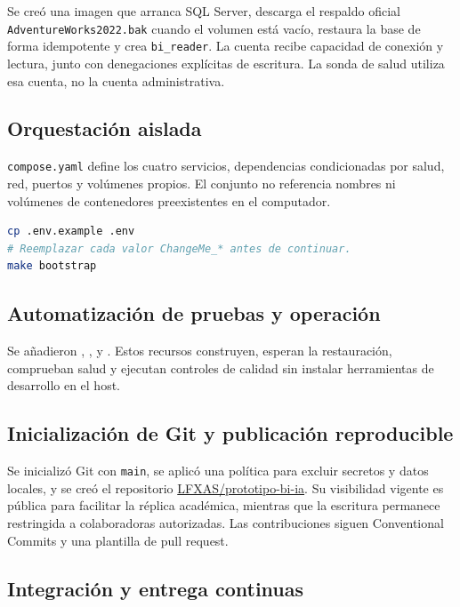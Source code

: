 \documentclass[11pt,letterpaper]{article}
\newcommand{\file}[1]{\texttt{#1}}
\begin{document}
Se creó una imagen que arranca SQL Server, descarga el respaldo oficial \file{AdventureWorks2022.bak} cuando el volumen está vacío, restaura la base de forma idempotente y crea \file{bi\_reader}. La cuenta recibe capacidad de conexión y lectura, junto con denegaciones explícitas de escritura. La sonda de salud utiliza esa cuenta, no la cuenta administrativa.

\subsection{Orquestación aislada}

\file{compose.yaml} define los cuatro servicios, dependencias condicionadas por salud, red, puertos y volúmenes propios. El conjunto no referencia nombres ni volúmenes de contenedores preexistentes en el computador.

\begin{lstlisting}[style=terminal,language=bash]
cp .env.example .env
# Reemplazar cada valor ChangeMe_* antes de continuar.
make bootstrap
\end{lstlisting}

\subsection{Automatización de pruebas y operación}

Se añadieron , ,  y . Estos recursos construyen, esperan la restauración, comprueban salud y ejecutan controles de calidad sin instalar herramientas de desarrollo en el host.

\subsection{Inicialización de Git y publicación reproducible}

Se inicializó Git con \file{main}, se aplicó una política para excluir secretos y datos locales, y se creó el repositorio \href{https://github.com/LFXAS/prototipo-bi-ia}{LFXAS/prototipo-bi-ia}. Su visibilidad vigente es pública para facilitar la réplica académica, mientras que la escritura permanece restringida a colaboradoras autorizadas. Las contribuciones siguen Conventional Commits y una plantilla de pull request.

\subsection{Integración y entrega continuas}
\end{document}
